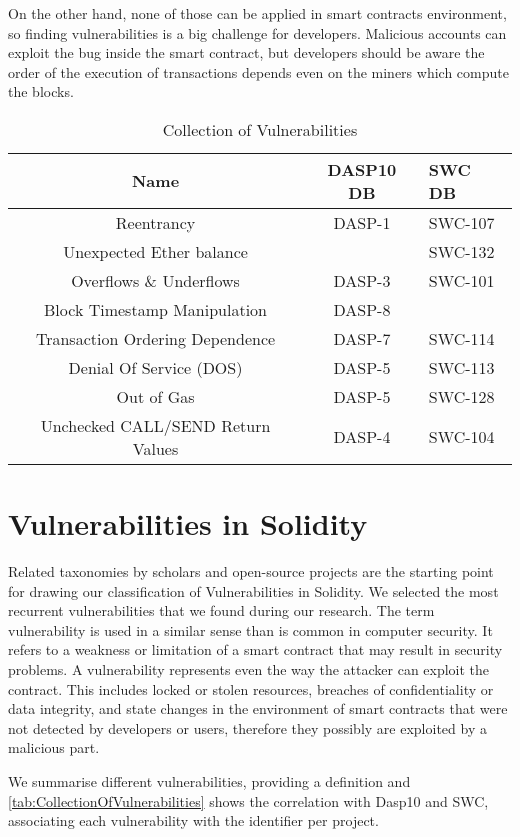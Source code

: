 \documentclass[a4paper,sigconf, language=french,
language=german, language=spanish, language=english]{acmart}
\begin{document}
On the other hand, none of those can be applied in smart contracts environment, so finding vulnerabilities is a big challenge for developers. 
Malicious accounts can exploit the bug inside the smart contract, but developers should be aware the order of the execution of transactions depends even on the miners which compute the blocks.


\begin{table*}
  \caption{Collection of Vulnerabilities}
  \label{tab:CollectionOfVulnerabilities}
  \begin{tabular}{ccl}
    \toprule
    Name  & DASP10 DB & SWC DB \\
    \midrule
    Reentrancy  & DASP-1 & SWC-107\\
    Unexpected Ether balance  & & SWC-132  \\
    Overflows \& Underflows  & DASP-3 & SWC-101\\
    Block Timestamp Manipulation  & DASP-8 & \\
    Transaction Ordering Dependence  & DASP-7  & SWC-114 \\
    Denial Of Service (DOS)  & DASP-5 &  SWC-113\\
    Out of Gas  & DASP-5 & SWC-128 \\
     Unchecked CALL/SEND Return Values  & DASP-4 & SWC-104\\
  \bottomrule
\end{tabular}
\end{table*}

\section{Vulnerabilities in Solidity}
\label{Vulnerabilities}
Related taxonomies by scholars and open-source projects are the starting point for drawing our classification of Vulnerabilities in Solidity. 
We selected the most recurrent vulnerabilities that we found during our research.
The term vulnerability is used in a similar sense than is common in computer security. 
It refers to a weakness or limitation of a smart contract that may result in
security problems. 
A vulnerability represents even the way the attacker can exploit the contract. 
This includes locked or stolen resources, breaches of confidentiality or data integrity, and state
changes in the environment of smart contracts that were not
detected by developers or users, therefore they possibly are exploited by a malicious part.

We summarise different vulnerabilities, providing a definition and \autoref{tab:CollectionOfVulnerabilities} shows the correlation with Dasp10 and SWC, associating each vulnerability with the identifier per project.
\end{document}
